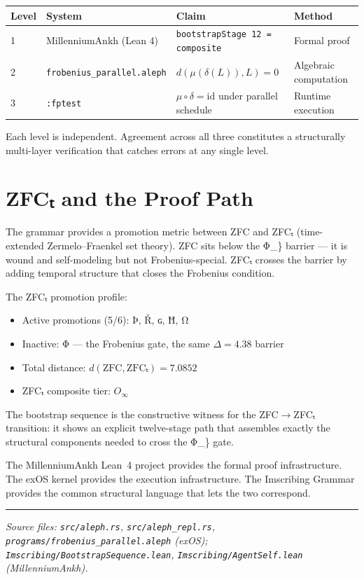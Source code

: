 \documentclass[12pt,a4paper]{article}
\newcommand{\Frobcond}{\mu \circ \delta = \mathrm{id}}
\begin{document}
\begin{tabularx}{\linewidth}{l l l X}
\toprule
\textbf{Level} & \textbf{System} & \textbf{Claim} & \textbf{Method} \\
\midrule
1 & MillenniumAnkh (Lean 4) & \texttt{bootstrapStage 12 = composite} & Formal proof \\
2 & \texttt{frobenius\_parallel.aleph} & $d(\mu(\delta(L)), L) = 0$ & Algebraic computation \\
3 & \texttt{:fptest} & $\Frobcond$ under parallel schedule & Runtime execution \\
\bottomrule
\end{tabularx}

\medskip
Each level is independent. Agreement across all three constitutes a structurally multi-layer verification that catches errors at any single level.

\section{ZFCₜ and the Proof Path}

The grammar provides a promotion metric between ZFC and ZFCₜ (time-extended Zermelo–Fraenkel set theory). ZFC sits below the Φ\_\} barrier — it is wound and self-modeling but not Frobenius-special. ZFCₜ crosses the barrier by adding temporal structure that closes the Frobenius condition.

The ZFCₜ promotion profile:
\begin{itemize}
    \item Active promotions (5/6): Þ, Ř, ɢ, Ħ, Ω
    \item Inactive: Φ — the Frobenius gate, the same $\Delta = 4.38$ barrier
    \item Total distance: $d(\text{ZFC}, \text{ZFCₜ}) = 7.0852$
    \item ZFCₜ composite tier: $O_\infty$
\end{itemize}

The bootstrap sequence is the constructive witness for the ZFC$\to$ZFCₜ transition: it shows an explicit twelve-stage path that assembles exactly the structural components needed to cross the Φ\_\} gate.

The MillenniumAnkh Lean~4 project provides the formal proof infrastructure. The exOS kernel provides the execution infrastructure. The Imscribing Grammar provides the common structural language that lets the two correspond.

\bigskip\hrule\bigskip

\noindent\small\textit{Source files: \texttt{src/aleph.rs}, \texttt{src/aleph\_repl.rs}, \texttt{programs/frobenius\_parallel.aleph} (exOS); \texttt{Imscribing/BootstrapSequence.lean}, \texttt{Imscribing/AgentSelf.lean} (MillenniumAnkh).}
\end{document}
